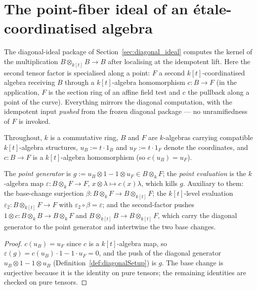 \section{The point-fiber ideal of an \'etale-coordinatised algebra}
\label{sec:point_fiber_ideal}

The diagonal-ideal package of Section~\ref{sec:diagonal_ideal} computes the kernel of the
multiplication \(B \otimes_{k[t]} B \to B\) after localising at the idempotent lift. Here
the second tensor factor is specialised along a point: \(F\) a second
\(k[t]\)-coordinatised algebra receiving \(B\) through a \(k[t]\)-algebra homomorphism
\(c \colon B \to F\) (in the application, \(F\) is the section ring of an affine field test
and \(c\) the pullback along a point of the curve). Everything mirrors the diagonal
computation, with the idempotent input \emph{pushed} from the frozen diagonal package — no
unramifiedness of \(F\) is invoked.

Throughout, \(k\) is a commutative ring, \(B\) and \(F\) are \(k\)-algebras carrying
compatible \(k[t]\)-algebra structures, \(u_B := t \cdot 1_B\) and \(u_F := t \cdot 1_F\)
denote the coordinates, and \(c \colon B \to F\) is a \(k[t]\)-algebra homomorphism (so
\(c(u_B) = u_F\)).

\begin{definition}
  \label{def:pointGen_pointEv}
  \leanok
  The \emph{point generator} is \(g := u_B \otimes 1 - 1 \otimes u_F \in B \otimes_k F\);
  the \emph{point evaluation} is the \(k\)-algebra map
  \(\varepsilon \colon B \otimes_k F \to F\), \(x \otimes \lambda \mapsto c(x)\lambda\),
  which kills \(g\). Auxiliary to them: the base-change surjection
  \(\beta \colon B \otimes_k F \to B \otimes_{k[t]} F\); the \(k[t]\)-level evaluation
  \(\varepsilon_2 \colon B \otimes_{k[t]} F \to F\) with
  \(\varepsilon_2 \circ \beta = \varepsilon\); and the second-factor pushes
  \(1 \otimes c \colon B \otimes_k B \to B \otimes_k F\) and
  \(B \otimes_{k[t]} B \to B \otimes_{k[t]} F\), which carry the diagonal generator to the
  point generator and intertwine the two base changes.
\end{definition}
\begin{proof}
  \leanok
  \(c(u_B) = u_F\) since \(c\) is a \(k[t]\)-algebra map, so
  \(\varepsilon(g) = c(u_B)\cdot 1 - 1 \cdot u_F = 0\), and the push of the diagonal
  generator \(u_B \otimes 1 - 1 \otimes u_B\) (Definition~\ref{def:diagonalSetup}) is \(g\).
  The base change is surjective because it is the identity on pure tensors; the remaining
  identities are checked on pure tensors.
\end{proof}

